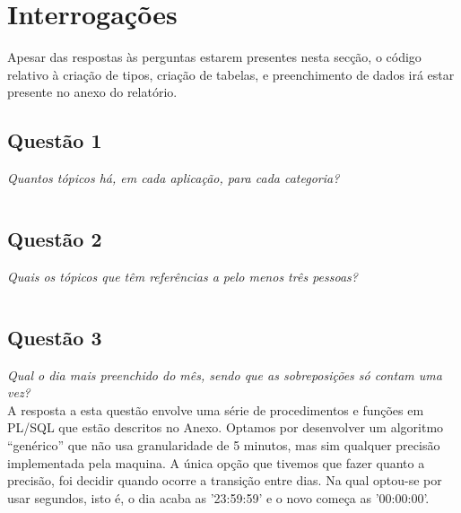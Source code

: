 \documentclass[a4paper,12pt]{article}
\begin{document}
\section{Interrogações}

	Apesar das respostas às perguntas estarem presentes nesta secção, o código relativo à criação de tipos, criação de tabelas, e preenchimento de dados irá estar presente no anexo do relatório.


\subsection{Questão 1}

	\emph{Quantos tópicos há, em cada aplicação, para cada categoria?}\\

	\inputminted{sql}{1.sql}

\subsection{Questão 2}

	\emph{Quais os tópicos que têm referências a pelo menos três pessoas?}\\

	\inputminted{sql}{2.sql}

\subsection{Questão 3}

	\emph{Qual o dia mais preenchido do mês, sendo que as sobreposições só contam uma vez?	}\\

	A resposta a esta questão envolve uma série de procedimentos e funções em PL/SQL que estão descritos no Anexo.
	Optamos por desenvolver um algoritmo ``genérico'' que não usa granularidade de 5 minutos, mas sim qualquer precisão implementada pela maquina. A única opção que tivemos que fazer quanto a precisão, foi decidir quando ocorre a transição entre dias. Na qual optou-se por usar segundos, isto é, o dia acaba as '23:59:59' e o novo começa as '00:00:00'.

\end{document}

